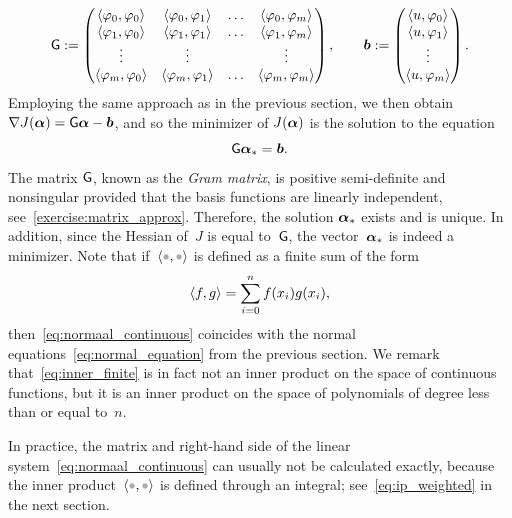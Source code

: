 \begin{equation}
    \label{eq:approx_matrix_m}
    \mathsf G :=
    \begin{pmatrix}
        \langle\varphi_0, \varphi_0\rangle & \langle\varphi_0, \varphi_1\rangle & \hdots & \langle\varphi_0, \varphi_m\rangle \\
        \langle\varphi_1, \varphi_0\rangle & \langle\varphi_1, \varphi_1\rangle & \hdots & \langle\varphi_1, \varphi_m\rangle \\
        \vdots & \vdots & & \vdots \\
        \langle\varphi_m, \varphi_0\rangle & \langle\varphi_m, \varphi_1\rangle & \hdots & \langle\varphi_m, \varphi_m\rangle
    \end{pmatrix},
    \qquad
    \mathbf{\boldsymbol{b}} :=
    \begin{pmatrix}
        \langle u, \varphi_0\rangle \\
        \langle u, \varphi_1\rangle \\
        \vdots \\
        \langle u, \varphi_m\rangle \\
    \end{pmatrix}.
\end{equation}
Employing the same approach as in the previous section,
we then obtain $\nabla J(\mathbf{\boldsymbol{\alpha}}) = \mathsf G \mathbf{\boldsymbol{\alpha}} - \mathbf{\boldsymbol{b}}$,
and so the minimizer of $J(\mathbf{\boldsymbol{\alpha}})$ is the solution to the equation
\begin{equation}
    \label{eq:normaal_continuous}
    \mathsf G \mathbf{\boldsymbol{\alpha}}_* = \mathbf{\boldsymbol{b}}.
\end{equation}
The matrix $\mathsf G$,
known as the \emph{Gram matrix},
is positive semi-definite and nonsingular provided that the basis functions are linearly independent,
see~\cref{exercise:matrix_approx}.
Therefore, the solution $\mathbf{\boldsymbol{\alpha}}_*$ exists and is unique.
In addition, since the Hessian of~$J$ is equal to~$\mathsf G$,
the vector~$\mathbf{\boldsymbol{\alpha}}_*$ is indeed a minimizer.
Note that if~$\ip{\placeholder,\placeholder}$ is defined as a finite sum of the form
\begin{equation}
    \label{eq:inner_finite}
    \langle f, g\rangle = \sum_{i=0}^{n} f(x_i) g(x_i),
\end{equation}
then~\eqref{eq:normaal_continuous} coincides with the normal equations~\eqref{eq:normal_equation} from the previous section.
We remark that~\eqref{eq:inner_finite} is in fact not an inner product on the space of continuous functions,
but it is an inner product on the space of polynomials of degree less than or equal to~$n$.

In practice, the matrix and right-hand side of the linear system~\eqref{eq:normaal_continuous} can usually not be calculated exactly,
because the inner product~$\ip{\placeholder,\placeholder}$ is defined through an integral; see~\eqref{eq:ip_weighted} in the next section.

